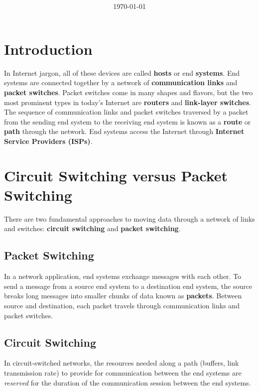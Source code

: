 \documentclass[11pt]{article}
\title{\textbf{\Topic}}
\author{\Name}
\date{\today}
\begin{document}
\maketitle
\tableofcontents
\newpage

\section{Introduction}

In Internet jargon, all of these devices are called \textbf{hosts} or end \textbf{systems}.
End systems are connected together by a network of \textbf{communication links} and \textbf{packet switches}.
Packet switches come in many shapes and flavors, but the two most prominent types in today’s Internet are \textbf{routers} and \textbf{link-layer switches}.
The sequence of communication links and packet switches traversed by a packet from the sending end system to the receiving end system is known as a \textbf{route} or \textbf{path} through the network.
End systems access the Internet through \textbf{Internet Service Providers (ISPs)}.

\section{Circuit Switching versus Packet Switching}

There are two fundamental approaches to moving data through a network of links and switches: \textbf{circuit switching} and \textbf{packet switching}. 

\subsection{Packet Switching}

In a network application, end systems exchange messages with each other. To send a message from a source end system to a destination end system, the source breaks long messages into smaller chunks of data known as \textbf{packets}. Between source and destination, each packet travels through communication links and packet switches.

\subsection{Circuit Switching}

In circuit-switched networks, the resources needed along a path (buffers, link transmission rate) to provide for communication between the end systems are \textit{reserved} for the duration of the communication session between the end systems.
\end{document}
